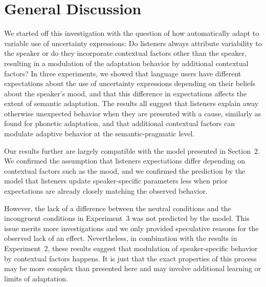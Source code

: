 \documentclass[man,floatsintext]{apa6}
\begin{document}
\section{General Discussion}

We started off this investigation with the question of how automatically adapt to variable use of uncertainty expressions: Do listeners always attribute variability to the speaker or do they incorporate contextual factors other than the speaker, resulting in a modulation of the adaptation behavior by additional contextual factors? In three experiments, we showed that language users have different expectations about the use of uncertainty expressions depending on their beliefs about the speaker's mood, and that this difference in expectations affects the extent of semantic adaptation. The results all suggest that listeners explain away otherwise unexpected behavior when they are presented with a cause, similarly as  found for phonetic adaptation, and that additional contextual factors can modulate adaptive behavior at the semantic-pragmatic level.

Our results further are largely compatible with the model presented in Section~2. We confirmed the assumption that listeners expectations differ depending on contextual factors such as the mood, and we confirmed the prediction by the model that listeners update speaker-specific parameters less when prior expectations are already closely matching the observed behavior.  

However, the lack of a difference between the neutral conditions and the incongruent conditions in Experiment~3 was not predicted by the model. This issue merits more investigations and we only provided speculative reasons for the observed lack of an effect. Nevertheless, in combination with the results in Experiment~2,  these results suggest that modulation of speaker-specific behavior by contextual factors happens. It is just that the exact properties of this process may be more complex than presented here and may involve additional learning or limits of adaptation.
\end{document}
